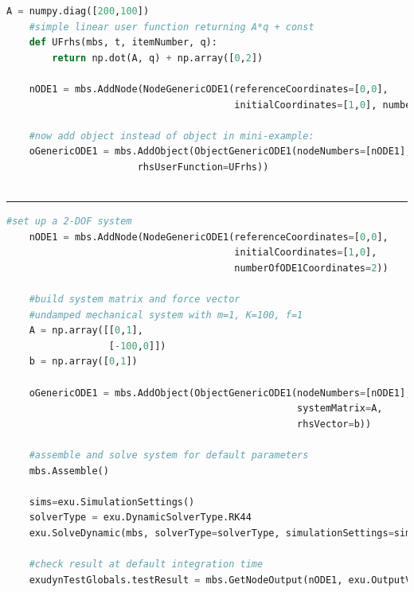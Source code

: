    \userFunctionExample{}
    \pythonstyle
    \begin{lstlisting}[language=Python]
    A = numpy.diag([200,100])
    #simple linear user function returning A*q + const
    def UFrhs(mbs, t, itemNumber, q): 
        return np.dot(A, q) + np.array([0,2])
        
    nODE1 = mbs.AddNode(NodeGenericODE1(referenceCoordinates=[0,0],
                                        initialCoordinates=[1,0], numberOfODE1Coordinates=2))

    #now add object instead of object in mini-example:
    oGenericODE1 = mbs.AddObject(ObjectGenericODE1(nodeNumbers=[nODE1], 
                       rhsUserFunction=UFrhs))
                                 
    \end{lstlisting}
\vspace{6pt}\par\noindent\rule{\textwidth}{0.4pt}
\label{miniExample_ObjectGenericODE1}
\pythonstyle
\begin{lstlisting}[language=Python, firstnumber=1]
    #set up a 2-DOF system
    nODE1 = mbs.AddNode(NodeGenericODE1(referenceCoordinates=[0,0],
                                        initialCoordinates=[1,0],
                                        numberOfODE1Coordinates=2))

    #build system matrix and force vector
    #undamped mechanical system with m=1, K=100, f=1
    A = np.array([[0,1],
                  [-100,0]])
    b = np.array([0,1])
    
    oGenericODE1 = mbs.AddObject(ObjectGenericODE1(nodeNumbers=[nODE1], 
                                                   systemMatrix=A, 
                                                   rhsVector=b))
    
    #assemble and solve system for default parameters
    mbs.Assemble()
    
    sims=exu.SimulationSettings()
    solverType = exu.DynamicSolverType.RK44
    exu.SolveDynamic(mbs, solverType=solverType, simulationSettings=sims)

    #check result at default integration time
    exudynTestGlobals.testResult = mbs.GetNodeOutput(nODE1, exu.OutputVariableType.Coordinates)[0]

\end{lstlisting}


